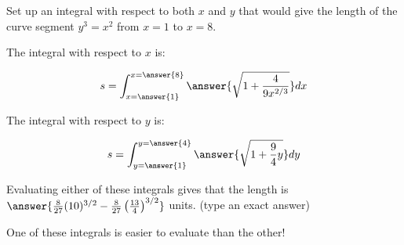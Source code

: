 \documentclass{ximera}
\author{Jim Talamo}
\begin{document}
\begin{exercise}

Set up an integral with respect to both $x$ and $y$ that would give the length of the curve segment $y^3=x^2$ from $x=1$ to $x=8$.

The integral with respect to $x$ is:

\[
s= \int_{x=\answer{1}}^{x=\answer{8}} \answer{\sqrt{1+\frac{4}{9x^{2/3}}}} dx
\]

The integral with respect to $y$ is:

\[
s= \int_{y=\answer{1}}^{y=\answer{4}} \answer{\sqrt{1+\frac{9}{4}y}} dy
\]

Evaluating either of these integrals gives that the length is $\answer{\frac{8}{27} (10)^{3/2}-\frac{8}{27} \left(\frac{13}{4}\right)^{3/2}}$ units. (type an exact answer)

\begin{remark}
One of these integrals is easier to evaluate than the other!
\end{remark}
\end{exercise}
\end{document}
